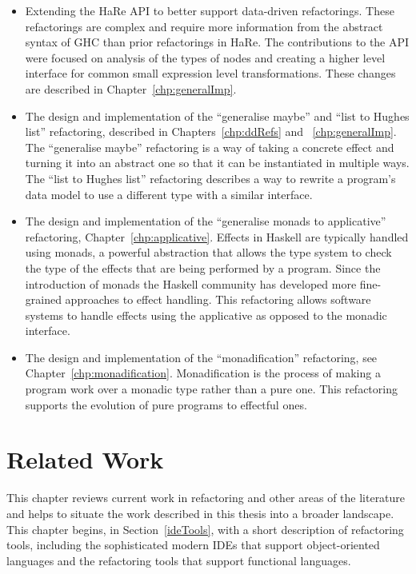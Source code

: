 \begin{itemize}
	\item Extending the HaRe API to better support data-driven refactorings. These refactorings are complex and require more information from the abstract syntax of GHC than prior refactorings in HaRe. The contributions to the API were focused on analysis of the types of nodes and creating a higher level interface for common small expression level transformations. These changes are described in Chapter~\ref{chp:generalImp}.
	\item The design and implementation of the ``generalise maybe'' and ``list to Hughes list'' refactoring, described in Chapters~\ref{chp:ddRefs} and ~\ref{chp:generalImp}. The ``generalise maybe'' refactoring is a way of taking a concrete effect and turning it into an abstract one so that it can be instantiated in multiple ways. The ``list to Hughes list'' refactoring describes a way to rewrite  a program's data model to use a different type with a similar interface.
	\item The design and implementation of the ``generalise monads to applicative'' refactoring, Chapter~\ref{chp:applicative}. Effects in Haskell are typically handled using monads, a powerful abstraction that allows the type system to check the type of the effects that are being performed by a program. Since the introduction of monads the Haskell community has developed more fine-grained approaches to effect handling. This refactoring allows software systems to handle effects using the applicative as opposed to the monadic interface.
	\item The design and implementation of the ``monadification'' refactoring, see Chapter~\ref{chp:monadification}. Monadification is the process of making a program work over a monadic type rather than a pure one. This refactoring supports the evolution of pure programs to effectful ones.
\end{itemize}


\chapter{Related Work}
\label{chp:related}

This chapter reviews current work in refactoring and other areas of the literature and helps to situate the work described in this thesis into a broader landscape. This chapter begins, in Section~\ref{ideTools}, with a short description of refactoring tools, including the sophisticated modern IDEs that support object-oriented languages and the refactoring tools that support functional languages. 

